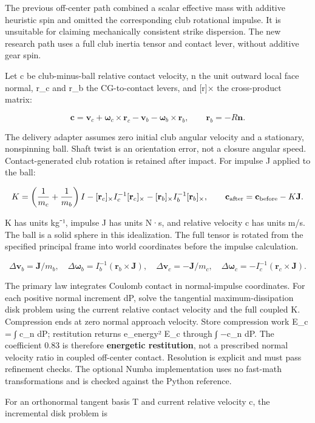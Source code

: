 \documentclass[
]{article}
\begin{document}
The previous off-center path combined a scalar effective mass with
additive heuristic spin and omitted the corresponding club rotational
impulse. It is unsuitable for claiming mechanically consistent strike
dispersion. The new research path uses a full club inertia tensor and
contact lever, without additive gear spin.

Let c be club-minus-ball relative contact velocity, n the unit outward
local face normal, r\_c and r\_b the CG-to-contact levers, and {[}r{]}×
the cross-product matrix:

\[\mathbf c=\mathbf v_c+\boldsymbol\omega_c\times\mathbf r_c-\mathbf v_b-\boldsymbol\omega_b\times\mathbf r_b,\qquad \mathbf r_b=-R\mathbf n.\]

The delivery adapter assumes zero initial club angular velocity and a
stationary, nonspinning ball. Shaft twist is an orientation error, not a
closure angular speed. Contact-generated club rotation is retained after
impact. For impulse J applied to the ball:

\[K=\left(\frac{1}{m_c}+\frac{1}{m_b}\right)I
-[\mathbf r_c]_\times I_c^{-1}[\mathbf r_c]_\times
-[\mathbf r_b]_\times I_b^{-1}[\mathbf r_b]_\times,\qquad
\mathbf c_{\rm after}=\mathbf c_{\rm before}-K\mathbf J.\]

K has units kg⁻¹, impulse J has units N·s, and relative velocity c has
units m/s. The ball is a solid sphere in this idealization. The full
tensor is rotated from the specified principal frame into world
coordinates before the impulse calculation.

\[\Delta\mathbf v_b=\mathbf J/m_b,\quad
\Delta\boldsymbol\omega_b=I_b^{-1}(\mathbf r_b\times\mathbf J),\quad
\Delta\mathbf v_c=-\mathbf J/m_c,\quad
\Delta\boldsymbol\omega_c=-I_c^{-1}(\mathbf r_c\times\mathbf J).\]

The primary law integrates Coulomb contact in normal-impulse
coordinates. For each positive normal increment dP, solve the tangential
maximum-dissipation disk problem using the current relative contact
velocity and the full coupled K. Compression ends at zero normal
approach velocity. Store compression work E\_c = ∫ c\_n dP; restitution
returns e\_energy² E\_c through ∫ −c\_n dP. The coefficient 0.83 is
therefore \textbf{energetic restitution}, not a prescribed normal
velocity ratio in coupled off-center contact. Resolution is explicit and
must pass refinement checks. The optional Numba implementation uses no
fast-math transformations and is checked against the Python reference.

For an orthonormal tangent basis T and current relative velocity c, the
incremental disk problem is
\end{document}
